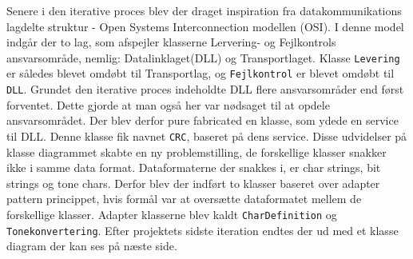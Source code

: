 Senere i den iterative proces blev der draget inspiration fra datakommunikations lagdelte struktur - Open Systems Interconnection modellen (OSI). I denne model indgår der to lag, som afspejler klasserne Lervering- og Fejlkontrols ansvarsområde, nemlig: Datalinklaget(DLL) og Transportlaget. Klasse \texttt{Levering} er således blevet omdøbt til Transportlag, og \texttt{Fejlkontrol} er blevet omdøbt til \texttt{DLL}.
\newline
Grundet den iterative proces indeholdte DLL flere ansvarsområder end først forventet. Dette gjorde at man også her var nødsaget til at opdele ansvarsområdet. Der blev derfor pure fabricated en klasse, som ydede en service til DLL. Denne klasse fik navnet \texttt{CRC}, baseret på dens service.
\hfill \break
Disse udvidelser på klasse diagrammet skabte en ny problemstilling, de forskellige klasser snakker ikke i samme data format. Dataformaterne der snakkes i, er char strings, bit strings og tone chars.
\newline
Derfor blev der indført to klasser baseret over adapter pattern princippet, hvis formål var at oversætte dataformatet mellem de forskellige klasser. Adapter klasserne blev kaldt \texttt{CharDefinition} og \texttt{Tonekonvertering}.
\hfill \break
Efter projektets sidste iteration endtes der ud med et klasse diagram der kan ses på næste side.
\afterpage{\null\newpage}